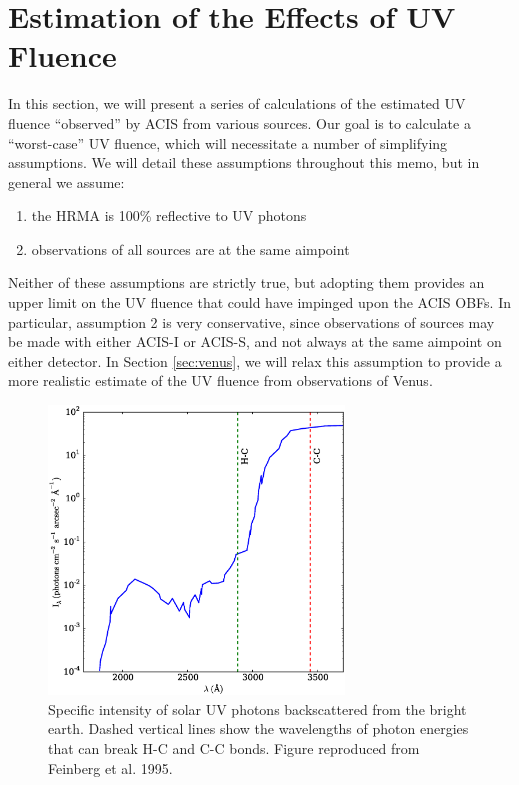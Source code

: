 \documentclass[11pt]{article}
\begin{document}
\section{Estimation of the Effects of UV Fluence}

In this section, we will present a series of calculations of the estimated UV fluence
``observed'' by ACIS from various sources. Our goal is to calculate a ``worst-case'' UV
fluence, which will necessitate a number of simplifying assumptions. We will detail these
assumptions throughout this memo, but in general we assume:

\begin{enumerate}
\item the HRMA is 100\% reflective to UV photons
\item observations of all sources are at the same aimpoint
\end{enumerate}

Neither of these assumptions are strictly true, but adopting them provides an upper limit on
the UV fluence that could have impinged upon the ACIS OBFs. In particular, assumption 2 is very
conservative, since observations of sources may be made with either ACIS-I or ACIS-S, and not
always at the same aimpoint on either detector. In Section \ref{sec:venus}, we will relax this
assumption to provide a more realistic estimate of the UV fluence from observations of Venus.

\begin{figure}
\begin{center}
\includegraphics[width=0.7\textwidth]{bright_earth_intensity.eps}
\caption{Specific intensity of solar UV photons backscattered from the bright earth. Dashed
vertical lines show the wavelengths of photon energies that can break H-C and C-C bonds.
Figure reproduced from Feinberg et al. 1995.\label{fig:bright_earth_intensity}}
\end{center}
\end{figure}
\end{document}
